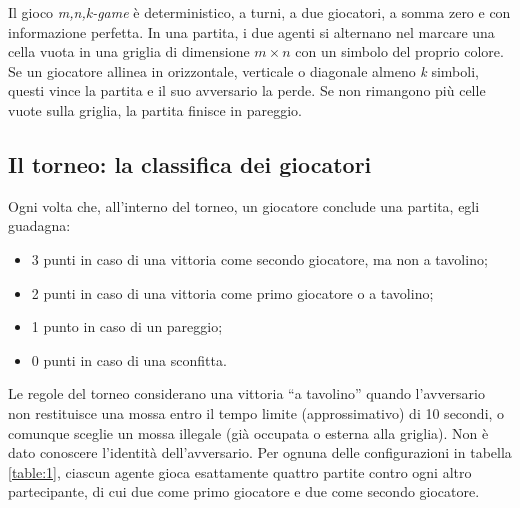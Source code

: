 \documentclass{article}
\begin{document}
Il gioco \emph{m,n,k-game} è deterministico, a turni, a due giocatori, a somma
zero e con informazione perfetta. In una partita, i due agenti si alternano nel
marcare una cella vuota in una griglia di dimensione $m\times n$ con un simbolo
del proprio colore. Se un giocatore allinea in orizzontale, verticale o
diagonale almeno \emph{k} simboli, questi vince la partita e il suo avversario
la perde. Se non rimangono più celle vuote sulla griglia, la partita finisce
in pareggio.

\subsection{Il torneo: la classifica dei giocatori} \label{tournament}

Ogni volta che, all'interno del torneo, un giocatore conclude una partita, egli
guadagna: 
\begin{itemize}
  \item 3 punti in caso di una vittoria come secondo giocatore, ma non a
    tavolino;
  \item 2 punti in caso di una vittoria come primo giocatore o a tavolino;
  \item 1 punto in caso di un pareggio;
  \item 0 punti in caso di una sconfitta.
\end{itemize}

\noindent
Le regole del torneo considerano una vittoria ``a tavolino'' quando l'avversario
non restituisce una mossa entro il tempo limite (approssimativo) di 10 secondi,
o comunque sceglie un mossa illegale (già occupata o esterna alla griglia). Non
è dato conoscere l'identità dell'avversario. Per ognuna delle configurazioni in
tabella \ref{table:1}, ciascun agente gioca esattamente quattro partite contro
ogni altro partecipante, di cui due come primo giocatore e due come secondo
giocatore.
\end{document}
